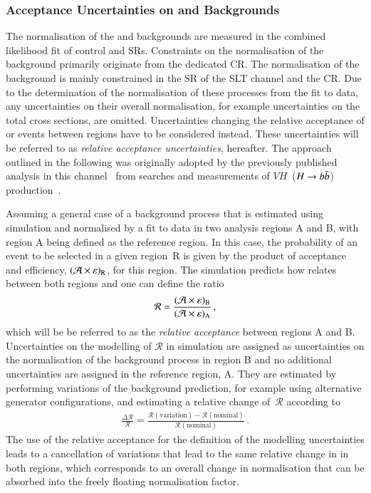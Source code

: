 \subsubsection{Acceptance Uncertainties on \ZHF and \ttbar Backgrounds}

The normalisation of the \ZHF and \ttbar backgrounds are measured in the
combined likelihood fit of control and SRs. Constraints on the normalisation of
the \ZHF background primarily originate from the dedicated CR. The normalisation
of the \ttbar background is mainly constrained in the SR of the \lephad SLT
channel and the \ZHF CR. Due to the determination of the normalisation of these
processes from the fit to data, any uncertainties on their overall
normalisation, for example uncertainties on the total cross sections, are
omitted. Uncertainties changing the relative acceptance of \ZHF or \ttbar events
between regions have to be considered instead. These uncertainties will be
referred to as \emph{relative acceptance uncertainties}, hereafter. The approach
outlined in the following was originally adopted by the previously published
analysis in this channel~\cite{HIGG-2016-16-witherratum} from searches and
measurements of $VH$~($H\to b\bar{b}$)
production~\cite{HIGG-2016-29,HIGG-2018-04,HIGG-2018-51}.

Assuming a general case of a background process that is estimated using
simulation and normalised by a fit to data in two analysis regions A and B, with
region A being defined as the reference region. In this case, the probability of
an event to be selected in a given region~R is given by the product of
acceptance and efficiency, $(\mathcal{A} \times \varepsilon)_{\text{R}}$, for this region. The
simulation predicts how \AccTimesEff relates between both regions and one can
define the ratio
\begin{align*}
  \mathcal{R} = \frac{(\mathcal{A} \times \varepsilon)_{\text{B}}}{(\mathcal{A} \times \varepsilon)_{\text{A}}} \,\text{,}
\end{align*}
which will be be referred to as the \emph{relative acceptance} between regions A
and B. Uncertainties on the modelling of $\mathcal{R}$ in simulation are
assigned as uncertainties on the normalisation of the background process in
region B and no additional uncertainties are assigned
in the reference region, A. They are estimated by performing variations of the
background prediction, for example using alternative generator configurations,
and estimating a relative change of~$\mathcal{R}$ according to
\begin{align}
  \frac{\Delta \mathcal{R}}{\mathcal{R}} = \frac{\mathcal{R}(\text{variation}) - \mathcal{R}(\text{nominal})}{\mathcal{R}(\text{nominal})} \,\text{.}
  \label{eq:relative_acceptance_uncertainty}
\end{align}
The use of the relative acceptance for the definition of the modelling
uncertainties leads to a cancellation of variations that lead to the same
relative change in \AccTimesEff in both regions, which corresponds to an overall
change in normalisation that can be absorbed into the freely floating
normalisation factor.

